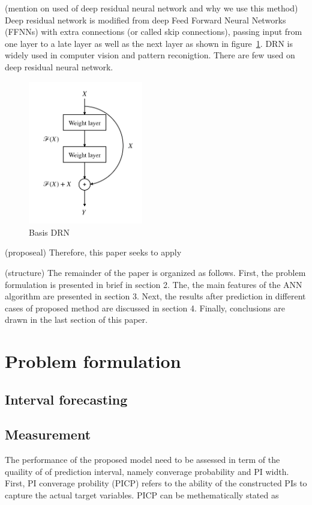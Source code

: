 \documentclass[review]{elsarticle}
\begin{document}
  (mention on used of deep residual neural network and why we use this method)
  Deep residual network is modified from deep Feed Forward Neural Networks (FFNNs) with extra connections (or called skip connections), passing input from one layer to a late layer as well as the next layer as shown in figure~\ref{Fig:Basic_DRN}. DRN is widely used in computer vision and pattern reconigtion. There are few used on deep residual neural network.

  \begin{figure}[H]
    \caption{Basis DRN}
    \label{Fig:Basic_DRN}
    \includegraphics[width=5cm]{basic_DRN}
  \centering
  \end{figure}


  (proposeal) Therefore, this paper seeks to apply

  (structure) The remainder of the paper is organized as follows. First, the problem formulation is presented in brief in section 2. The, the main features of the ANN algorithm are presented in section 3. Next, the results after prediction in different cases of proposed method  are discussed in section 4. Finally, conclusions are drawn in the last section of this paper.

\section{Problem formulation}

  \subsection{Interval forecasting}

  \subsection{Measurement}
    The performance of the proposed model need to be assessed in term of the quaility of of prediction interval, namely converage probability and PI width. First,  PI converage probility (PICP) refers to the ability of the constructed PIs to capture the actual target variables. PICP can be methematically stated as
\end{document}
